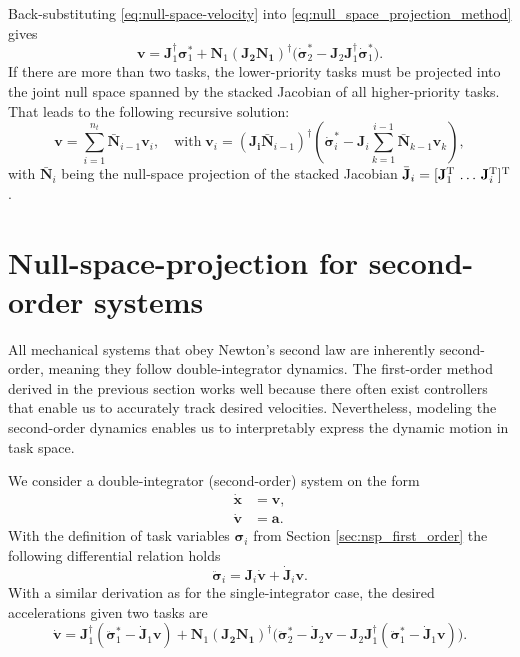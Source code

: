 Back-substituting \eqref{eq:null-space-velocity} into \eqref{eq:null_space_projection_method} gives
\begin{equation}\label{eq:NSP_two_tasks}
    \mathbf{v} = \mathbf{J}_1^\dagger \bm{\sigma}_1^* + \mathbf{N}_1 (\mathbf{J_2} \mathbf{N_1})^\dagger\bigl(\dot{\bm{\sigma}}_2^* - \mathbf{J}_2 \mathbf{J}_1^\dagger \dot{\bm{\sigma}}_1^*\bigr).
\end{equation}
If there are more than two tasks, the lower-priority tasks must be projected into the joint null space spanned by the stacked Jacobian of all higher-priority tasks. That leads to the following recursive solution:
\begin{equation}\label{eq:nsp_recursive}
    \mathbf{v} = \sum_{i=1}^{n_t} \bar{\mathbf{N}}_{i-1} \mathbf{v}_i, \quad \mathrm{with} \; \mathbf{v}_i = \left(\mathbf{J_i} \bar{\mathbf{N}}_{i-1}\right)^\dagger\left(\dot{\bm{\sigma}}_i^* - \mathbf{J}_i \sum_{k=1}^{i-1} \bar{\mathbf{N}}_{k-1} \mathbf{v}_k\right),
\end{equation}
with $\bar{\mathbf{N}}_i$ being the null-space projection of the stacked Jacobian $\bar{\mathbf{J}}_i = [\mathbf{J}_1^{\rm T}\, \ldots \, \mathbf{J}_{i}^{\rm T}]^{\rm T}$.

\section{Null-space-projection for second-order systems}\label{sec:nsp_second_order}
All mechanical systems that obey Newton's second law are inherently second-order, meaning they follow double-integrator dynamics. The first-order method derived in the previous section works well because there often exist controllers that enable us to accurately track desired velocities. Nevertheless, modeling the second-order dynamics enables us to interpretably express the dynamic motion in task space.

We consider a double-integrator (second-order) system on the form
\begin{align}\label{eq:double_integrator}
    \dot{\mathbf{x}} &= \mathbf{v},\\
    \dot{\mathbf{v}} &= \mathbf{a}.
\end{align}
With the definition of task variables $\bm{\sigma}_i$ from Section \ref{sec:nsp_first_order} the following differential relation holds
\begin{equation}
    \ddot{\bm{\sigma}}_i = \mathbf{J}_i \dot{\mathbf{v}} + \dot{\mathbf{J}}_i \mathbf{v}.
\end{equation}
With a similar derivation as for the single-integrator case, the desired accelerations given two tasks are
\begin{equation}
    \dot{\mathbf{v}} = \mathbf{J}_1^\dagger (\ddot{\bm{\sigma}}_1^* -\dot{\mathbf{J}}_1 \mathbf{v}) + \mathbf{N}_1 (\mathbf{J_2} \mathbf{N_1})^\dagger\bigl(\ddot{\bm{\sigma}}_2^*  - \dot{\mathbf{J}}_2 \mathbf{v} - \mathbf{J}_2 \mathbf{J}_1^\dagger (\ddot{\bm{\sigma}}_1^* - \dot{\mathbf{J}}_1 \mathbf{v})\bigr).
\end{equation}

